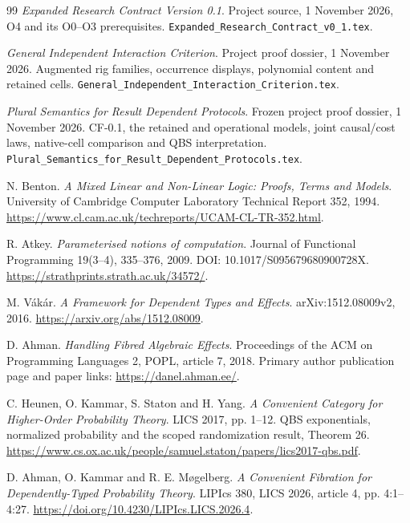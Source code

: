 \documentclass[11pt,a4paper]{article}
\theoremstyle{definition}
\begin{document}
\begin{thebibliography}{99}
\emph{Expanded Research Contract Version 0.1}. Project source,
1 November 2026, O4 and its O0--O3 prerequisites.
\texttt{Expanded\_Research\_Contract\_v0\_1.tex}.

\emph{General Independent Interaction Criterion}. Project proof dossier,
1 November 2026. Augmented rig families, occurrence displays, polynomial
content and retained cells.
\texttt{General\_Independent\_Interaction\_Criterion.tex}.

\emph{Plural Semantics for Result Dependent Protocols}. Frozen project
proof dossier, 1 November 2026. CF-0.1, the retained and operational models,
joint causal/cost laws, native-cell comparison and QBS interpretation.
\texttt{Plural\_Semantics\_for\_Result\_Dependent\_Protocols.tex}.

N. Benton. \emph{A Mixed Linear and Non-Linear Logic: Proofs, Terms and
Models}. University of Cambridge Computer Laboratory Technical Report 352,
1994. \url{https://www.cl.cam.ac.uk/techreports/UCAM-CL-TR-352.html}.

R. Atkey. \emph{Parameterised notions of computation}.
Journal of Functional Programming 19(3--4), 335--376, 2009.
DOI: 10.1017/S095679680900728X.
\url{https://strathprints.strath.ac.uk/34572/}.

M. V\'{a}k\'{a}r. \emph{A Framework for Dependent Types and Effects}.
arXiv:1512.08009v2, 2016. \url{https://arxiv.org/abs/1512.08009}.

D. Ahman. \emph{Handling Fibred Algebraic Effects}.
Proceedings of the ACM on Programming Languages 2, POPL, article 7, 2018.
Primary author publication page and paper links:
\url{https://danel.ahman.ee/}.

C. Heunen, O. Kammar, S. Staton and H. Yang.
\emph{A Convenient Category for Higher-Order Probability Theory}.
LICS 2017, pp. 1--12. QBS exponentials, normalized probability and the
scoped randomization result, Theorem 26.
\url{https://www.cs.ox.ac.uk/people/samuel.staton/papers/lics2017-qbs.pdf}.

D. Ahman, O. Kammar and R. E. M\o gelberg.
\emph{A Convenient Fibration for Dependently-Typed Probability Theory}.
LIPIcs 380, LICS 2026, article 4, pp. 4:1--4:27.
\url{https://doi.org/10.4230/LIPIcs.LICS.2026.4}.
\end{thebibliography}
\end{document}
